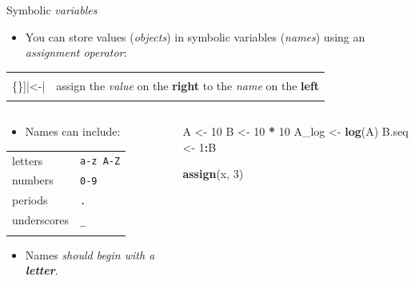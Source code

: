 \documentclass[
  11pt,
  ignorenonframetext,
]{beamer}
\newcommand{\VERB}{\Verb[commandchars=\\\{\}]}
\newenvironment{Shaded}{\begin{snugshade}}{\end{snugshade}}
\newcommand{\DecValTok}[1]{\textcolor[rgb]{0.00,0.00,0.81}{#1}}
\newcommand{\FunctionTok}[1]{\textcolor[rgb]{0.13,0.29,0.53}{\textbf{#1}}}
\newcommand{\NormalTok}[1]{#1}
\newcommand{\OtherTok}[1]{\textcolor[rgb]{0.56,0.35,0.01}{#1}}
\newcommand{\SpecialCharTok}[1]{\textcolor[rgb]{0.81,0.36,0.00}{\textbf{#1}}}
\newcommand{\StringTok}[1]{\textcolor[rgb]{0.31,0.60,0.02}{#1}}
\providecommand{\tightlist}{%
  \setlength{\itemsep}{0pt}\setlength{\parskip}{0pt}}
\begin{document}
\begin{frame}[fragile]{Symbolic \emph{variables}}
\protect\hypertarget{symbolic-variables}{}
\begin{itemize}
\tightlist
\item
  You can store values (\emph{objects}) in symbolic variables
  (\emph{names}) using an \emph{assignment operator}:
\end{itemize}

\begin{longtable}[]{@{}ll@{}}
\toprule\noalign{}
\endhead
\VERB|\OtherTok{\textless{}{-}}| & assign the \emph{value} on the
\textbf{right} to the \emph{name} on the \textbf{left} \\
\bottomrule\noalign{}
\end{longtable}

\begin{columns}[T,onlytextwidth]
\begin{column}{0.48\textwidth}
\begin{itemize}
\tightlist
\item
  Names can include:
\end{itemize}

\begin{longtable}[]{@{}ll@{}}
\toprule\noalign{}
\endhead
letters & \StringTok{\texttt{a-z A-Z}} \\
numbers & \StringTok{\texttt{0-9}} \\
periods & \StringTok{\texttt{.}} \\
underscores & \StringTok{\texttt{\_}} \\
\bottomrule\noalign{}
\end{longtable}

\begin{itemize}
\tightlist
\item
  Names \emph{should begin with a \textbf{\StringTok{letter}}}.
\end{itemize}
\end{column}

\begin{column}{0.48\textwidth}
\begin{Shaded}
\begin{Highlighting}[]
\NormalTok{A }\OtherTok{\textless{}{-}} \DecValTok{10}
\NormalTok{B }\OtherTok{\textless{}{-}} \DecValTok{10} \SpecialCharTok{*} \DecValTok{10}
\NormalTok{A\_log }\OtherTok{\textless{}{-}} \FunctionTok{log}\NormalTok{(A)}
\NormalTok{B.seq }\OtherTok{\textless{}{-}} \DecValTok{1}\SpecialCharTok{:}\NormalTok{B}

\FunctionTok{assign}\NormalTok{(}\StringTok{\textquotesingle{}x\textquotesingle{}}\NormalTok{, }\DecValTok{3}\NormalTok{)}
\end{Highlighting}
\end{Shaded}
\end{column}
\end{columns}
\end{frame}
\end{document}
